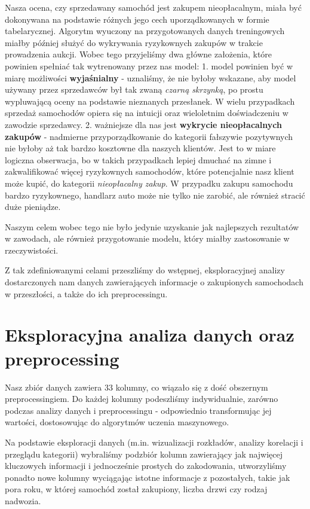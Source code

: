 \documentclass[11pt]{article}
\begin{document}
Nasza ocena, czy sprzedawany samochód jest zakupem nieopłacalnym, miała
być dokonywana na podstawie różnych jego cech uporządkowanych w formie
tabelarycznej. Algorytm wyuczony na przygotowanych danych treningowych
miałby później służyć do wykrywania ryzykownych zakupów w trakcie
prowadzenia aukcji. Wobec tego przyjeliśmy dwa główne założenia, które
powinien spełniać tak wytrenowany przez nas model: 1. model powinien być
w miarę możliwości \textbf{wyjaśnialny} - uznaliśmy, że nie byłoby
wskazane, aby model używany przez sprzedawców był tak zwaną \emph{czarną
skrzynką}, po prostu wypluwającą oceny na podstawie nieznanych
przesłanek. W wielu przypadkach sprzedaż samochodów opiera się na
intuicji oraz wieloletnim doświadczeniu w zawodzie sprzedawcy. 2.
ważniejsze dla nas jest \textbf{wykrycie nieopłacalnych zakupów} -
nadmierne przyporządkowanie do kategorii fałszywie pozytywnych nie
byłoby aż tak bardzo kosztowne dla naszych klientów. Jest to w miare
logiczna obserwacja, bo w takich przypadkach lepiej dmuchać na zimne i
zakwalifikować więcej ryzykownych samochodów, które potencjalnie nasz
klient może kupić, do kategorii \emph{nieopłacalny zakup}. W przypadku
zakupu samochodu bardzo ryzykownego, handlarz auto może nie tylko nie
zarobić, ale również stracić duże pieniądze.

Naszym celem wobec tego nie było jedynie uzyskanie jak najlepszych
rezultatów w zawodach, ale również przygotowanie modelu, który miałby
zastosowanie w rzeczywistości.

Z tak zdefiniowanymi celami przeszliśmy do wstępnej, eksploracyjnej
analizy dostarczonych nam danych zawierających informacje o zakupionych
samochodach w przeszłości, a także do ich preprocessingu.

    \hypertarget{eksploracyjna-analiza-danych-oraz-preprocessing}{%
\section{Eksploracyjna analiza danych oraz
preprocessing}\label{eksploracyjna-analiza-danych-oraz-preprocessing}}

Nasz zbiór danych zawiera 33 kolumny, co wiązało się z dość obszernym
preprocessingiem. Do każdej kolumny podeszliśmy indywidualnie, zarówno
podczas analizy danych i preprocessingu - odpowiednio transformując jej
wartości, dostosowując do algorytmów uczenia maszynowego.

Na podstawie eksploracji danych (m.in. wizualizacji rozkładów, analizy
korelacji i przeglądu kategorii) wybraliśmy podzbiór kolumn zawierający
jak najwięcej kluczowych informacji i jednocześnie prostych do
zakodowania, utworzyliśmy ponadto nowe kolumny wyciągając istotne
informacje z pozostałych, takie jak pora roku, w której samochód został
zakupiony, liczba drzwi czy rodzaj nadwozia.
\end{document}

